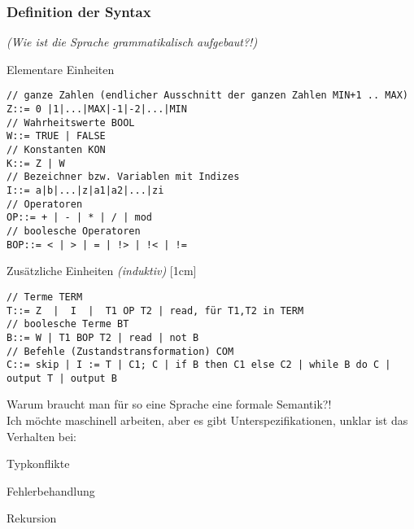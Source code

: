 \subsubsection{Definition der Syntax}
\emph{(Wie ist die Sprache grammatikalisch aufgebaut?!)}
\begin{compactitem}
	\item [Elementare Einheiten] \emph{}
	\begin{lstlisting}
// ganze Zahlen (endlicher Ausschnitt der ganzen Zahlen MIN+1 .. MAX)
Z::= 0 |1|...|MAX|-1|-2|...|MIN 
// Wahrheitswerte BOOL
W::= TRUE | FALSE
// Konstanten KON
K::= Z | W
// Bezeichner bzw. Variablen mit Indizes
I::= a|b|...|z|a1|a2|...|zi
// Operatoren
OP::= + | - | * | / | mod
// boolesche Operatoren
BOP::= < | > | = | !> | !< | !=
	\end{lstlisting}
	\item [Zusätzliche Einheiten] \emph{(induktiv)}
	[1cm]
	\begin{lstlisting}
// Terme TERM
T::= Z  |  I  |  T1 OP T2 | read, für T1,T2 in TERM
// boolesche Terme BT
B::= W | T1 BOP T2 | read | not B
// Befehle (Zustandstransformation) COM
C::= skip | I := T | C1; C | if B then C1 else C2 | while B do C |  output T | output B
	\end{lstlisting}
\end{compactitem}
Warum braucht man für so eine Sprache eine formale Semantik?!\\
Ich möchte maschinell arbeiten, aber es gibt Unterspezifikationen, unklar ist das Verhalten bei:
\begin{compactitem}
\item Typkonflikte
\item Fehlerbehandlung
\item Rekursion
\end{compactitem}

